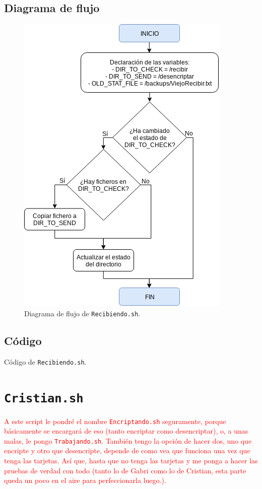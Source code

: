 \subsection{Diagrama de flujo}
\begin{figure}[h]
	\centering
	\includegraphics[scale=0.8]{Anexos/Anexo3/Diagramas/Recibiendo.png}
	\caption{Diagrama de flujo de \texttt{Recibiendo.sh}.}
	\label{Diagrama de flujo de Recibiendo.sh}
\end{figure}

\subsection{Código}

\begin{center}
	Código de \texttt{Recibiendo.sh}.
\end{center}

\section{\texttt{Cristian.sh}}
\hypertarget{ScriptCristian}{}
\textcolor{red}{A este script le pondré el nombre \texttt{Encriptando.sh} seguramente, porque básicamente se encargará de eso (tanto encriptar como desencriptar), o, a unas malas, le pongo \texttt{Trabajando.sh}. También tengo la opción de hacer dos, uno que encripte y otro que desencripte, depende de como vea que funciona una vez que tenga las tarjetas. Así que, hasta que no tenga las tarjetas y me ponga a hacer las pruebas de verdad con todo (tanto lo de Gabri como lo de Cristian, esta parte queda un poco en el aire para perfeccionarla luego.).}

